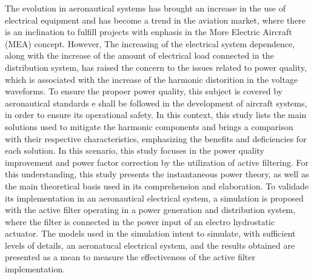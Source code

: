 The evolution in aeronautical systems has brought an increase in the use of electrical equipment and has become a trend in the aviation market, where there is an inclination to fulfill projects with enphasis in the More Electric Aircraft (MEA) concept. However, The increasing of the electrical system dependence, along with the increase of the amount of electrical load connected in the distribution system, has raised the concern to the issues related to power quality, which is associated with the increase of the harmonic distorition in the voltage waveforms. To ensure the propoer power quality, this subject is covered by aeronautical standards e shall be followed in the development of aircraft systems, in order to ensure its operational safety. In this context, this study lists the main solutions used to mitigate the harmonic components and brings a comparison with their respective characteristics, emphasizing the benefits and deficiencies for each solution. In this scenario, this study focuses in the power quality improvement and power factor correction by the utilization of active filtering. For this understanding, this study presents the instantaneous power theory, as well as the main theoretical basis used in its comprehension and elaboration. To validade its implementation in an aeronautical electrical system, a simulation is proposed with the active filter operating in a power generation and distribution system, where the filter is connected in the power input of an electro hydrostatic actuator. The models used in the simulation intent to simulate, with sufficient levels of details, an aeronatucal electrical system, and the results obtained are presented as a mean to measure the effectiveness of the active filter implementation.
